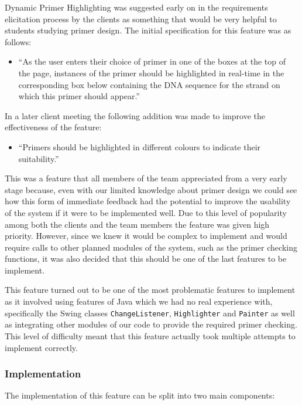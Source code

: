 
Dynamic Primer Highlighting was suggested early on in the requirements
elicitation process by the clients as something that would be very
helpful to students studying primer design. The initial specification
for this feature was as follows:

\begin{itemize}	
\item“As the user enters their choice of primer in one of the boxes at the
top of the page, instances of the primer should be highlighted in
real-time in the corresponding box below containing the DNA sequence for
the strand on which this primer should appear.”
\end{itemize}

In a later client meeting the following addition was made to improve the
effectiveness of the feature:

\begin{itemize}
\item“Primers should be highlighted in different colours to indicate their
suitability.”
\end{itemize}

This was a feature that all members of the team appreciated from a very early
stage because, even with our limited knowledge about primer design we
could see how this form of immediate feedback had the potential to
improve the usability of the system if it were to be implemented well.
Due to this level of popularity among both the clients and the team
members the feature was given high priority. However, since we knew it
would be complex to implement and would require calls to other planned
modules of the system, such as the primer checking functions, it was
also decided that this should be one of the last features to be
implement.

This feature turned out to be one of the most problematic features to
implement as it involved using features of Java which we had no real
experience with, specifically the Swing classes \texttt{ChangeListener},
\texttt{Highlighter} and \texttt{Painter} as well as integrating other
modules of our code to provide the required primer checking. This level
of difficulty meant that this feature actually took multiple attempts to
implement correctly.

\subsubsection{Implementation}

The implementation of this feature can be split into two main components:

